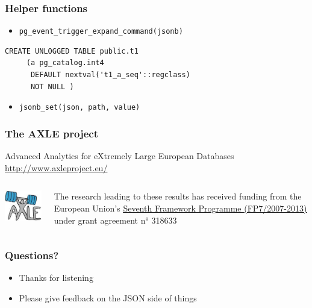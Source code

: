 \begin{frame}[fragile]
\frametitle{Helper functions}

\begin{itemize}
\item \texttt{pg\_event\_trigger\_expand\_command(jsonb)}
\end{itemize}

\begin{lstlisting}
CREATE UNLOGGED TABLE public.t1 
     (a pg_catalog.int4
      DEFAULT nextval('t1_a_seq'::regclass)
      NOT NULL )
\end{lstlisting}

\begin{itemize}
\item \texttt{jsonb\_set(json, path, value)}
\end{itemize}

\end{frame}

\frame
{ \frametitle{The AXLE project}

        Advanced Analytics for eXtremely Large European Databases \\

        \raggedleft
        {\LARGE \url{http://www.axleproject.eu/} }

    \vfill

\begin{columns}

\begin{column}{0.3\textwidth}
    \href{http://www.axleproject.eu/}{\includegraphics{axle-logo-weights.jpg}}
\end{column}
\begin{column}{0.7\textwidth}
\raggedleft \footnotesize
The research leading to these results has received funding from the European Union's \href{http://ec.europa.eu/research/fp7/index_en.cfm}{\underline{Seventh Framework Programme (FP7/2007-2013)}} under grant agreement n° 318633
\end{column}
\end{columns}
}

\frame
{ \frametitle{Questions?}

\begin{itemize}
\item Thanks for listening
\item Please give feedback on the JSON side of things
\end{itemize}
}

